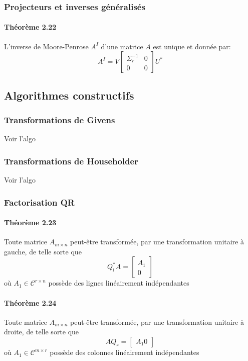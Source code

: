\subsubsection{Projecteurs et inverses généralisés}

\paragraph{Théorème 2.22} L'inverse de Moore-Penrose $A^I$ d'une matrice $A$ est unique et donnée par:
$$ A^I = V \begin{bmatrix}
\Sigma_r^{-1} & 0 \\
0 & 0
\end{bmatrix} U^*$$

\subsection{Algorithmes constructifs}

\subsubsection{Transformations de Givens}
Voir l'algo
\subsubsection{Transformations de Householder}
Voir l'algo
\subsubsection{Factorisation QR}

\paragraph{Théorème 2.23} Toute matrice $A_{m\times n}$ peut-être transformée, par une transformation unitaire à gauche, de telle sorte que
$$ Q^*_l A = \begin{bmatrix}
A_1 \\
0
\end{bmatrix} $$ où $A_1 \in \mathcal{C}^{r\times n}$ possède des lignes linéairement indépendantes

\paragraph{Théorème 2.24}  Toute matrice $A_{m\times n}$ peut-être transformée, par une transformation unitaire à droite, de telle sorte que
$$ AQ_r = \begin{bmatrix}
A_1 0
\end{bmatrix} $$ où $A_1 \in \mathcal{C}^{m\times r}$ possède des colonnes linéairement indépendantes

